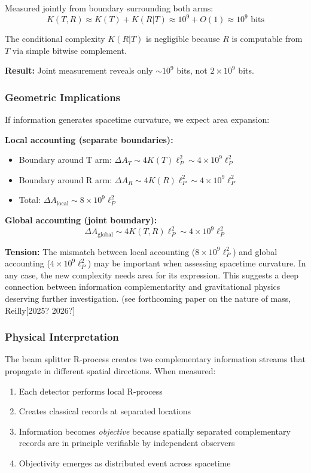 ﻿\documentclass[12pt]{article}
\begin{document}
Measured jointly from boundary surrounding both arms:
\begin{equation}
    K(T, R) \approx K(T) + K(R|T) \approx 10^9 + O(1) \approx 10^9 \text{ bits}
\end{equation}


The conditional complexity $K(R|T)$ is negligible because $R$ is computable 
from $T$ via simple bitwise complement.


\textbf{Result:} Joint measurement reveals only $\sim10^9$ bits, not $2 \times 10^9$ bits.


\subsubsection{Geometric Implications}


If information generates spacetime curvature, we expect area expansion:


\textbf{Local accounting (separate boundaries):}
\begin{itemize}
    \item Boundary around T arm: $\Delta A_T \sim 4K(T)\ell_P^2 \sim 4 \times 10^9 \ell_P^2$
    \item Boundary around R arm: $\Delta A_R \sim 4K(R)\ell_P^2 \sim 4 \times 10^9 \ell_P^2$
    \item Total: $\Delta A_{\text{local}} \sim 8 \times 10^9 \ell_P^2$
\end{itemize}


\textbf{Global accounting (joint boundary):}
\begin{equation}
    \Delta A_{\text{global}} \sim 4K(T,R)\ell_P^2 \sim 4 \times 10^9 \ell_P^2
\end{equation}


\textbf{Tension:} The mismatch between local accounting ($8 \times 10^9 \ell_P^2$) 
and global accounting ($4 \times 10^9 \ell_P^2$) may be important when assessing spacetime 
curvature. In any case, the new complexity needs area for its expression.  This suggests a deep connection between information complementarity and gravitational physics deserving further investigation. (see forthcoming paper on the nature of mass, Reilly[2025? 2026?]


\subsubsection{Physical Interpretation}


The beam splitter R-process creates two complementary information streams that 
propagate in different spatial directions. When measured:
\begin{enumerate}
    \item Each detector performs local R-process
    \item Creates classical records at separated locations  
    \item Information becomes \emph{objective} because spatially separated 
          complementary records are in principle verifiable by independent observers
    \item Objectivity emerges as distributed event across spacetime
\end{enumerate}
\end{document}
